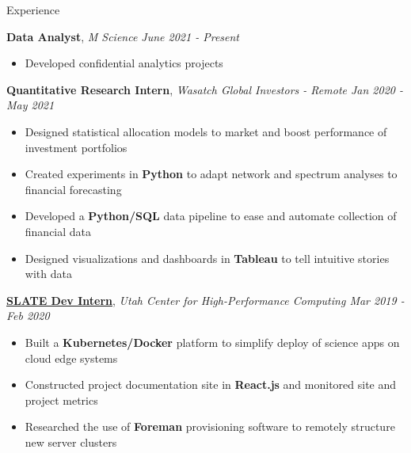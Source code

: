 \documentclass{resume/resume}
\begin{document}
\begin{rSection}{Experience}

    {\bf Data Analyst}, {\em M Science \hfill June 2021 - Present}
    \vspace{-6pt}
    \begin{itemize}[nosep]
        \item Developed confidential analytics projects
    \end{itemize}

    {\bf Quantitative Research Intern}, {\em Wasatch Global Investors - Remote \hfill Jan 2020 - May 2021}
    \vspace{-6pt}
    \begin{itemize}[nosep]
        \item Designed statistical allocation models to market and boost performance of investment portfolios
        \item Created experiments in {\bf Python} to adapt network and spectrum analyses to financial forecasting
        \item Developed a {\bf Python/SQL} data pipeline to ease and automate collection of financial data
        \item Designed visualizations and dashboards in {\bf Tableau} to tell intuitive stories with data
    \end{itemize}

    {\bf \href{https://slateci.io/}{SLATE Dev Intern}}, {\em Utah Center for High-Performance Computing \hfill Mar 2019 - Feb 2020}
    \vspace{-6pt}
    \begin{itemize}[nosep]
        \item Built a {\bf Kubernetes/Docker} platform to simplify deploy of science apps on cloud edge systems
        \item Constructed project documentation site in {\bf React.js} and monitored site and project metrics
        \item Researched the use of {\bf Foreman} provisioning software to remotely structure new server clusters
    \end{itemize}
    

\end{rSection}
\end{document}
